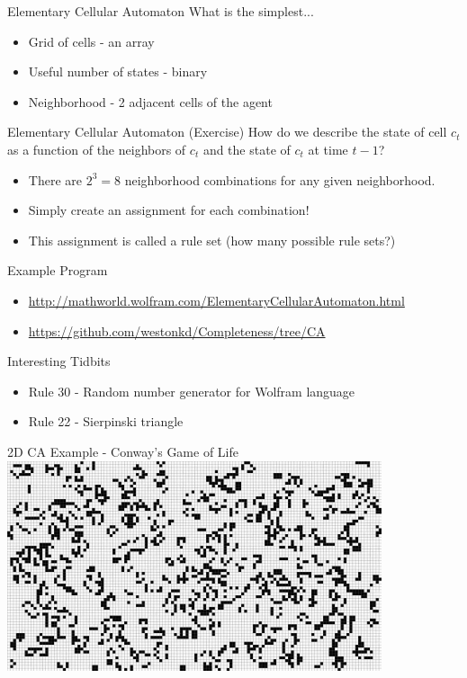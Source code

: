 \documentclass[bigger]{beamer}
\begin{document}
\begin{frame}[label=sec-10]{Elementary Cellular Automaton}
What is the simplest...
\begin{itemize}
\item<1->Grid of cells - an array
\item<1->Useful number of states - binary
\item<1->Neighborhood - 2 adjacent cells of the agent
\end{itemize}
\end{frame}

\begin{frame}[label=sec-11]{Elementary Cellular Automaton (Exercise)}
How do we describe the state of cell \(c_t\) as a function of the neighbors of \(c_t\) and the state of \(c_t\) at time \(t-1\)?
\begin{itemize}
\item<2->There are \(2^3 = 8\) neighborhood combinations for any given neighborhood.
\item<3->Simply create an assignment for each combination!
\item<4->This assignment is called a rule set (how many possible rule sets?)
\end{itemize}
\end{frame}
\begin{frame}[label=sec-12]{Example Program}
\begin{itemize}
\item \url{http://mathworld.wolfram.com/ElementaryCellularAutomaton.html}
\item \url{https://github.com/westonkd/Completeness/tree/CA}
\end{itemize}
\end{frame}

\begin{frame}[label=sec-13]{Interesting Tidbits}
\begin{itemize}
\item<1->Rule 30 - Random number generator for Wolfram language
\item<2->Rule 22 - Sierpinski triangle
\end{itemize}
\end{frame}
\begin{frame}[label=sec-14]{2D CA Example - Conway's Game of Life}
\includegraphics[width=11cm]{images/gol1.jpg}
\end{frame}
\end{document}
